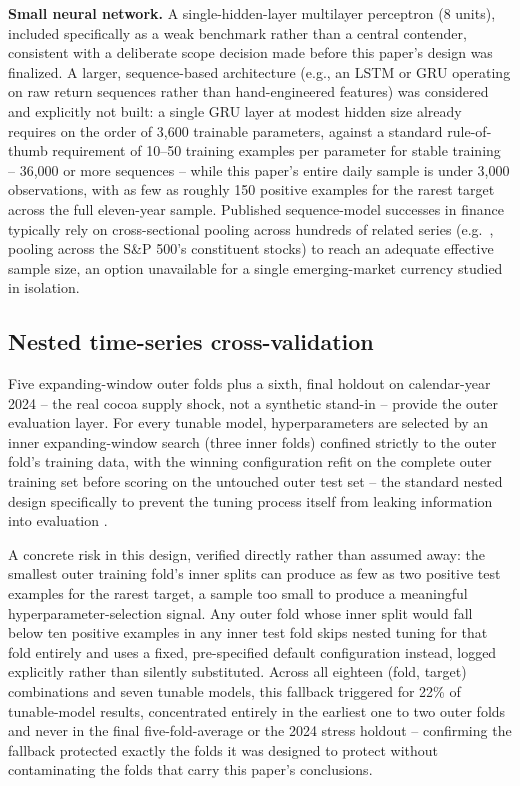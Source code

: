 \documentclass[final,3p,times,authoryear]{elsarticle}
\begin{document}
\textbf{Small neural network.} A single-hidden-layer multilayer
perceptron (8 units), included specifically as a weak benchmark rather
than a central contender, consistent with a deliberate scope decision
made before this paper's design was finalized. A larger, sequence-based
architecture (e.g., an LSTM or GRU operating on raw return sequences
rather than hand-engineered features) was considered and explicitly not
built: a single GRU layer at modest hidden size already requires on the
order of 3,600 trainable parameters, against a standard rule-of-thumb
requirement of 10--50 training examples per parameter for stable
training -- 36,000 or more sequences -- while this paper's entire daily
sample is under 3,000 observations, with as few as roughly 150 positive
examples for the rarest target across the full eleven-year sample.
Published sequence-model successes in finance typically rely on
cross-sectional pooling across hundreds of related series (e.g.\
\citealp{fischerkrauss2018}, pooling across the S\&P 500's constituent
stocks) to reach an adequate effective sample size, an option unavailable
for a single emerging-market currency studied in isolation.

\subsection{Nested time-series cross-validation}
\label{sec:nestedcv}

Five expanding-window outer folds plus a sixth, final holdout on
calendar-year 2024 -- the real cocoa supply shock, not a synthetic
stand-in -- provide the outer evaluation layer. For every tunable
model, hyperparameters are selected by an inner expanding-window search
(three inner folds) confined strictly to the outer fold's training data,
with the winning configuration refit on the complete outer training set
before scoring on the untouched outer test set -- the standard nested
design specifically to prevent the tuning process itself from leaking
information into evaluation \citep{vabalas2019}.

A concrete risk in this design, verified directly rather than assumed
away: the smallest outer training fold's inner splits can produce as
few as two positive test examples for the rarest target, a sample too
small to produce a meaningful hyperparameter-selection signal. Any
outer fold whose inner split would fall below ten positive examples in
any inner test fold skips nested tuning for that fold entirely and uses
a fixed, pre-specified default configuration instead, logged explicitly
rather than silently substituted. Across all eighteen (fold, target)
combinations and seven tunable models, this fallback triggered for
22\% of tunable-model results, concentrated entirely in the earliest
one to two outer folds and never in the final five-fold-average or the
2024 stress holdout -- confirming the fallback protected exactly the
folds it was designed to protect without contaminating the folds that
carry this paper's conclusions.
\end{document}
